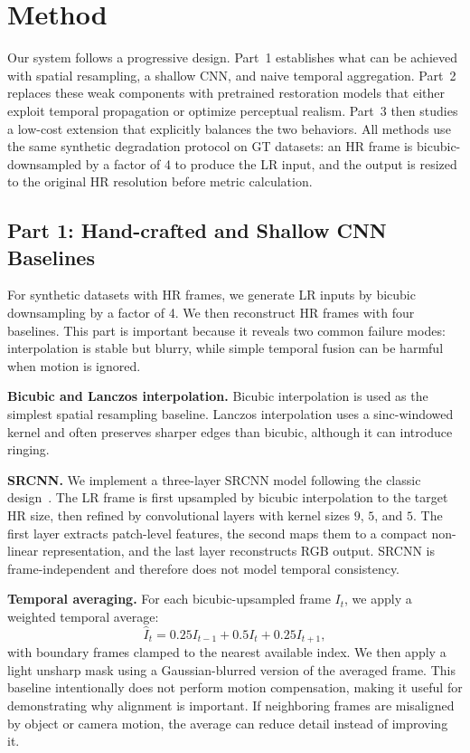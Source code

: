 \section{Method}
\label{sec:method}
Our system follows a progressive design. Part~1 establishes what can be achieved with spatial resampling, a shallow CNN, and naive temporal aggregation. Part~2 replaces these weak components with pretrained restoration models that either exploit temporal propagation or optimize perceptual realism. Part~3 then studies a low-cost extension that explicitly balances the two behaviors. All methods use the same synthetic degradation protocol on GT datasets: an HR frame is bicubic-downsampled by a factor of 4 to produce the LR input, and the output is resized to the original HR resolution before metric calculation.

\subsection{Part 1: Hand-crafted and Shallow CNN Baselines}
For synthetic datasets with HR frames, we generate LR inputs by bicubic downsampling by a factor of 4. We then reconstruct HR frames with four baselines. This part is important because it reveals two common failure modes: interpolation is stable but blurry, while simple temporal fusion can be harmful when motion is ignored.

\textbf{Bicubic and Lanczos interpolation.}
Bicubic interpolation is used as the simplest spatial resampling baseline. Lanczos interpolation uses a sinc-windowed kernel and often preserves sharper edges than bicubic, although it can introduce ringing.

\textbf{SRCNN.}
We implement a three-layer SRCNN model following the classic design~\cite{dong2015srcnn}. The LR frame is first upsampled by bicubic interpolation to the target HR size, then refined by convolutional layers with kernel sizes $9$, $5$, and $5$. The first layer extracts patch-level features, the second maps them to a compact non-linear representation, and the last layer reconstructs RGB output. SRCNN is frame-independent and therefore does not model temporal consistency.

\textbf{Temporal averaging.}
For each bicubic-upsampled frame $I_t$, we apply a weighted temporal average:
\begin{equation}
\hat{I}_t = 0.25 I_{t-1} + 0.5 I_t + 0.25 I_{t+1},
\end{equation}
with boundary frames clamped to the nearest available index. We then apply a light unsharp mask using a Gaussian-blurred version of the averaged frame. This baseline intentionally does not perform motion compensation, making it useful for demonstrating why alignment is important. If neighboring frames are misaligned by object or camera motion, the average can reduce detail instead of improving it.

